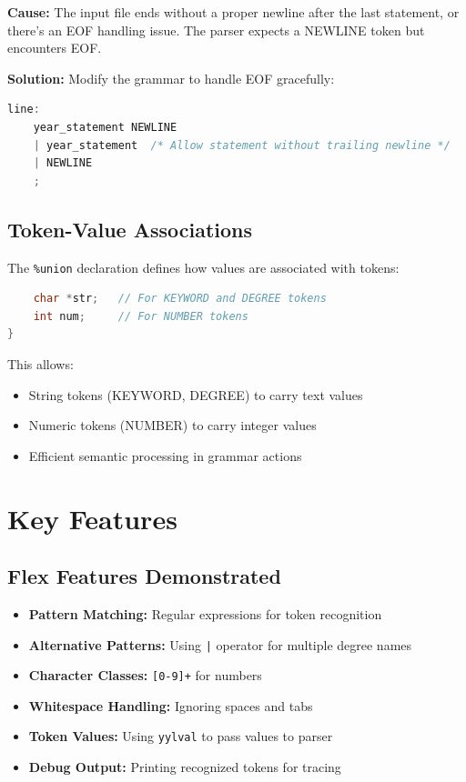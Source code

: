 \documentclass[12pt,a4paper]{article}
\begin{document}
\textbf{Cause:} The input file ends without a proper newline after the last statement, or there's an EOF handling issue. The parser expects a NEWLINE token but encounters EOF.

\textbf{Solution:} Modify the grammar to handle EOF gracefully:
\begin{lstlisting}[language=C]
line:
    year_statement NEWLINE
    | year_statement  /* Allow statement without trailing newline */
    | NEWLINE
    ;
\end{lstlisting}

\subsection{Token-Value Associations}
The \texttt{\%union} declaration defines how values are associated with tokens:
\begin{lstlisting}[language=C]
%union {
    char *str;   // For KEYWORD and DEGREE tokens
    int num;     // For NUMBER tokens
}
\end{lstlisting}

This allows:
\begin{itemize}
    \item String tokens (KEYWORD, DEGREE) to carry text values
    \item Numeric tokens (NUMBER) to carry integer values
    \item Efficient semantic processing in grammar actions
\end{itemize}

\section{Key Features}

\subsection{Flex Features Demonstrated}
\begin{itemize}
    \item \textbf{Pattern Matching:} Regular expressions for token recognition
    \item \textbf{Alternative Patterns:} Using \texttt{|} operator for multiple degree names
    \item \textbf{Character Classes:} \texttt{[0-9]+} for numbers
    \item \textbf{Whitespace Handling:} Ignoring spaces and tabs
    \item \textbf{Token Values:} Using \texttt{yylval} to pass values to parser
    \item \textbf{Debug Output:} Printing recognized tokens for tracing
\end{itemize}
\end{document}
